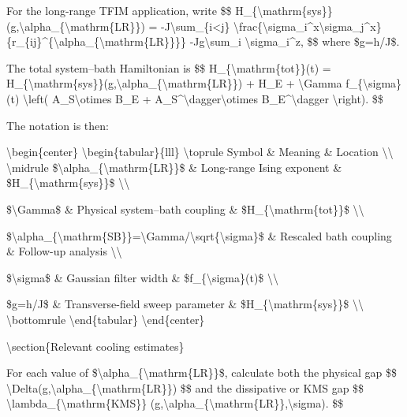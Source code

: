 {For the long-range TFIM application, write
\$\$
H\_\{\textbackslash{}mathrm\{sys\}\}(g,\textbackslash{}alpha\_\{\textbackslash{}mathrm\{LR\}\})
=
-J\textbackslash{}sum\_\{i<j\}
\textbackslash{}frac\{\textbackslash{}sigma\_i\textasciicircum{}x\textbackslash{}sigma\_j\textasciicircum{}x\}
\{r\_\{ij\}\textasciicircum{}\{\textbackslash{}alpha\_\{\textbackslash{}mathrm\{LR\}\}\}\}
-Jg\textbackslash{}sum\_i \textbackslash{}sigma\_i\textasciicircum{}z,
\$\$
where \$g=h/J\$.

The total system--bath Hamiltonian is
\$\$
H\_\{\textbackslash{}mathrm\{tot\}\}(t)
=
H\_\{\textbackslash{}mathrm\{sys\}\}(g,\textbackslash{}alpha\_\{\textbackslash{}mathrm\{LR\}\})
+
H\_E
+
\textbackslash{}Gamma f\_\{\textbackslash{}sigma\}(t)
\textbackslash{}left(
A\_S\textbackslash{}otimes B\_E
+
A\_S\textasciicircum{}\textbackslash{}dagger\textbackslash{}otimes B\_E\textasciicircum{}\textbackslash{}dagger
\textbackslash{}right).
\$\$

The notation is then:

\textbackslash{}begin\{center\}
\textbackslash{}begin\{tabular\}\{lll\}
\textbackslash{}toprule
Symbol \& Meaning \& Location \textbackslash{}\textbackslash{}
\textbackslash{}midrule
\$\textbackslash{}alpha\_\{\textbackslash{}mathrm\{LR\}\}\$
\& Long-range Ising exponent
\& \$H\_\{\textbackslash{}mathrm\{sys\}\}\$ \textbackslash{}\textbackslash{}

\$\textbackslash{}Gamma\$
\& Physical system--bath coupling
\& \$H\_\{\textbackslash{}mathrm\{tot\}\}\$ \textbackslash{}\textbackslash{}

\$\textbackslash{}alpha\_\{\textbackslash{}mathrm\{SB\}\}=\textbackslash{}Gamma/\textbackslash{}sqrt\{\textbackslash{}sigma\}\$
\& Rescaled bath coupling
\& Follow-up analysis \textbackslash{}\textbackslash{}

\$\textbackslash{}sigma\$
\& Gaussian filter width
\& \$f\_\{\textbackslash{}sigma\}(t)\$ \textbackslash{}\textbackslash{}

\$g=h/J\$
\& Transverse-field sweep parameter
\& \$H\_\{\textbackslash{}mathrm\{sys\}\}\$ \textbackslash{}\textbackslash{}
\textbackslash{}bottomrule
\textbackslash{}end\{tabular\}
\textbackslash{}end\{center\}

\textbackslash{}section\{Relevant cooling estimates\}

For each value of \$\textbackslash{}alpha\_\{\textbackslash{}mathrm\{LR\}\}\$, calculate both the physical gap
\$\$
\textbackslash{}Delta(g,\textbackslash{}alpha\_\{\textbackslash{}mathrm\{LR\}\})
\$\$
and the dissipative or KMS gap
\$\$
\textbackslash{}lambda\_\{\textbackslash{}mathrm\{KMS\}\}
(g,\textbackslash{}alpha\_\{\textbackslash{}mathrm\{LR\}\},\textbackslash{}sigma).
\$\$

}
